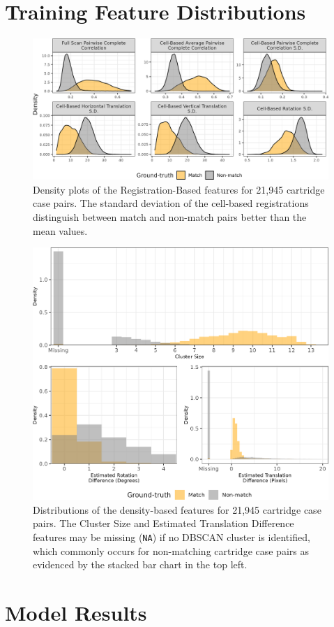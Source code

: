 \documentclass[reprint]{JASA}
\begin{document}
\begin{appendices}

\section{Training Feature Distributions}

\begin{figure}[htbp]
\includegraphics[width=.5\textwidth]{images/resultsPlots/featureDensity_registration} \caption{Density plots of the Registration-Based features for 21,945 cartridge case pairs. The standard deviation of the cell-based registrations distinguish between match and non-match pairs better than the mean values.}\label{fig:registrationDensities}
\end{figure}

\begin{figure}[htbp]
\includegraphics[width=.5\textwidth]{images/resultsPlots/featureDensity_densityBased} \caption{Distributions of the density-based features for 21,945 cartridge case pairs. The Cluster Size and Estimated Translation Difference features may be missing (\texttt{NA}) if no DBSCAN cluster is identified, which commonly occurs for non-matching cartridge case pairs as evidenced by the stacked bar chart in the top left.}\label{fig:densityDistributions}
\end{figure}

\section{Model Results}


\end{appendices}
\end{document}

